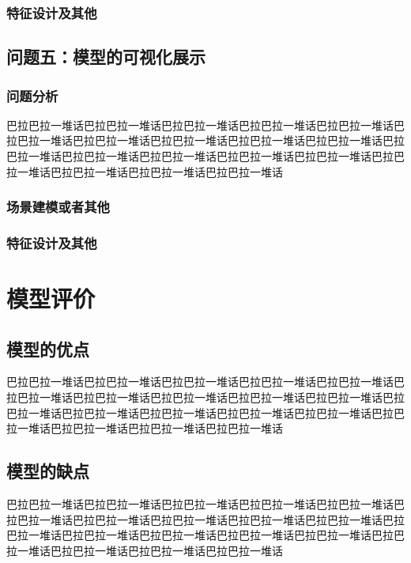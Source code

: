 \documentclass[bwprint]{gmcmthesis}
\begin{document}
\subsubsection{特征设计及其他}
\subsection{问题五：模型的可视化展示}
\subsubsection{问题分析}

巴拉巴拉一堆话巴拉巴拉一堆话巴拉巴拉一堆话巴拉巴拉一堆话巴拉巴拉一堆话巴拉巴拉一堆话巴拉巴拉一堆话巴拉巴拉一堆话巴拉巴拉一堆话巴拉巴拉一堆话巴拉巴拉一堆话巴拉巴拉一堆话巴拉巴拉一堆话巴拉巴拉一堆话巴拉巴拉一堆话巴拉巴拉一堆话巴拉巴拉一堆话巴拉巴拉一堆话巴拉巴拉一堆话
\subsubsection{场景建模或者其他}

\subsubsection{特征设计及其他}


\section{模型评价}


\subsection{模型的优点}
巴拉巴拉一堆话巴拉巴拉一堆话巴拉巴拉一堆话巴拉巴拉一堆话巴拉巴拉一堆话巴拉巴拉一堆话巴拉巴拉一堆话巴拉巴拉一堆话巴拉巴拉一堆话巴拉巴拉一堆话巴拉巴拉一堆话巴拉巴拉一堆话巴拉巴拉一堆话巴拉巴拉一堆话巴拉巴拉一堆话巴拉巴拉一堆话巴拉巴拉一堆话巴拉巴拉一堆话巴拉巴拉一堆话



\subsection{模型的缺点}
巴拉巴拉一堆话巴拉巴拉一堆话巴拉巴拉一堆话巴拉巴拉一堆话巴拉巴拉一堆话巴拉巴拉一堆话巴拉巴拉一堆话巴拉巴拉一堆话巴拉巴拉一堆话巴拉巴拉一堆话巴拉巴拉一堆话巴拉巴拉一堆话巴拉巴拉一堆话巴拉巴拉一堆话巴拉巴拉一堆话巴拉巴拉一堆话巴拉巴拉一堆话巴拉巴拉一堆话巴拉巴拉一堆话
\end{document}
